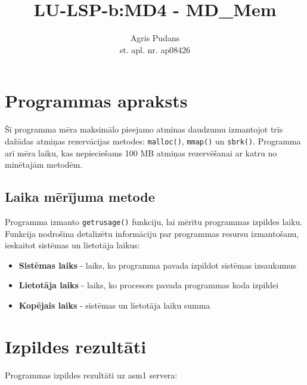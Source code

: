 \documentclass{report}
\title{LU-LSP-b:MD4 - MD\_Mem}
\author{Agris Pudans\\st. apl. nr. ap08426}
\date{}
\begin{document}
	\setcounter{page}{0}
	\maketitle

	
	
	\tableofcontents
	
	\section{Programmas apraksts}
	
	Šī programma mēra maksimālo pieejamo atminas daudzumu izmantojot trīs dažādas atmiņas rezervācijas metodes: \texttt{malloc()}, \texttt{mmap()} un \texttt{sbrk()}. Programma arī mēra laiku, kas nepieciešams 100 MB atmiņas rezervēšanai ar katru no minētajām metodēm.
	
	\subsection{Laika mērījuma metode}
	
	Programma izmanto \texttt{getrusage()} funkciju, lai mērītu programmas izpildes laiku. Funkcija nodrošina detalizētu informāciju par programmas resursu izmantošanu, ieskaitot sistēmas un lietotāja laikus:
	
	\begin{itemize}
		\item \textbf{Sistēmas laiks} - laiks, ko programma pavada izpildot sistēmas izsaukumus
		\item \textbf{Lietotāja laiks} - laiks, ko procesors pavada programmas koda izpildei
		\item \textbf{Kopējais laiks} - sistēmas un lietotāja laiku summa
	\end{itemize}
	
	\section{Izpildes rezultāti}
	
	Programmas izpildes rezultāti uz asm1 servera:
	
\end{document}
